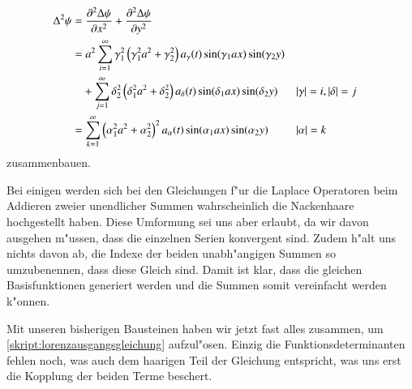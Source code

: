 \begin{refsection}
\begin{align*}
\laplace^2\psi
&= 
\frac{\partial^2\laplace\psi}{\partial x^2} + 
\frac{\partial^2\laplace\psi}{\partial y^2} \\
&=
a^2
\sum_{i = 1}^{\infty}
\gamma_1^2
\left(\gamma_1^2 a^2+\gamma_2^2\right)
a_{\gamma}(t)
\sin(\gamma_1 ax) \sin(\gamma_2 y)
\\
&\phantom{={}}
+
\sum_{j = 1}^{\infty}
\delta_2^2
\left(\delta_1^2 a^2+\delta_2^2\right)
a_{\delta}(t)
\sin(\delta_1 ax) \sin(\delta_2 y)
&&|\gamma| = i, |\delta| = j
\\
&=
\sum_{k = 1}^{\infty}
\left(\alpha_1^2 a^2+\alpha_2^2\right)^2
a_{\alpha}(t)
\sin(\alpha_1 ax) \sin(\alpha_2 y)
&&|\alpha| = k
\end{align*}
zusammenbauen.

Bei einigen werden sich bei den Gleichungen f"ur die Laplace Operatoren beim 
Addieren zweier unendlicher Summen wahrscheinlich die Nackenhaare hochgestellt 
haben. Diese Umformung sei uns aber erlaubt, da wir davon ausgehen m"ussen, 
dass die einzelnen Serien konvergent sind. Zudem h"alt uns nichts davon ab, die 
Indexe der beiden unabh"angigen Summen so umzubenennen, dass diese Gleich sind. 
Damit ist klar, dass die gleichen Basisfunktionen generiert werden und die 
Summen somit vereinfacht werden k"onnen.

Mit unseren bisherigen Bausteinen haben wir jetzt fast alles zusammen, um 
\cref{skript:lorenzausgangsgleichung} aufzul"osen. Einzig die 
Funktionsdeterminanten fehlen noch, was auch dem haarigen Teil der Gleichung 
entspricht, was uns erst die Kopplung der beiden Terme beschert.


\end{refsection}
